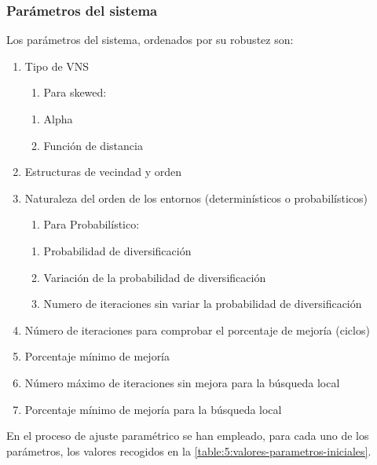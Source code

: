 \subsubsection{Parámetros del sistema} \label{sec:5:parametros-sistema}
Los parámetros del sistema, ordenados por su robustez son:
\begin{enumerate}
	\item Tipo de VNS
	\begin{enumerate}[label={},left=-1pt]
		\item Para skewed:
	\end{enumerate}
	\begin{enumerate}[label*={\arabic*}]
		\item Alpha
		\item Función de distancia 
	\end{enumerate}
	\item Estructuras de vecindad y orden
	\item Naturaleza del orden de los entornos (determinísticos o probabilísticos)
	\begin{enumerate}[label={},left=-1pt]
		\item Para Probabilístico:
	\end{enumerate}
	\begin{enumerate}[label*={\arabic*}]
		\item Probabilidad de diversificación
		\item Variación de la probabilidad de diversificación 
		\item Numero de iteraciones sin variar la probabilidad de diversificación 
	\end{enumerate}
	\item Número de iteraciones para comprobar el porcentaje de mejoría (ciclos)
	\item Porcentaje mínimo de mejoría
	\item Número máximo de iteraciones sin mejora para la búsqueda local
	\item Porcentaje mínimo de mejoría para la búsqueda local
\end{enumerate}

En el proceso de ajuste paramétrico se han empleado, para cada uno de los parámetros, los valores recogidos en la \autoref{table:5:valores-parametros-iniciales}.

